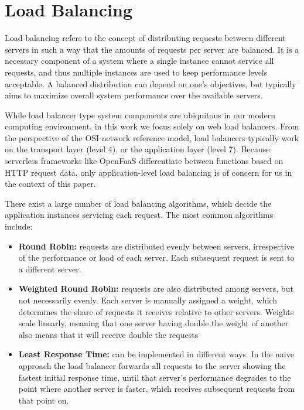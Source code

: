 \documentclass[draft,final]{vutinfth} %
\begin{document}
\section{Load Balancing}
Load balancing refers to the concept of distributing requests between different servers in such a way that the amounts of requests per server are balanced.
It is a necessary component of a system where a single instance cannot service all requests, and thus multiple instances are used to keep performance levels acceptable.
A balanced distribution can depend on one's objectives, but typically aims to maximize overall system performance over the available servers\cite{cardelliniDynamicLoadBalancing1999a}.

While load balancer type system components are ubiquitous in our modern computing environment, in this work we focus solely on web load balancers.
From the perspective of the OSI network reference model\cite{dayOSIReferenceModel1983}, load balancers typically work on the transport layer (level 4), or the application layer (level 7).
Because serverless frameworks like OpenFaaS differentiate between functions based on HTTP request data, only application-level load balancing is of concern for us in the context of this paper.

There exist a large number of load balancing algorithms, which decide the application instances servicing each request.
The most common algorithms include:
\begin{itemize}
    \item \textbf{Round Robin:} requests are distributed evenly between servers, irrespective of the performance or load of each server. Each subsequent request is sent to a different server.
    \item \textbf{Weighted Round Robin:} requests are also distributed among servers, but not necessarily evenly. Each server is manually assigned a weight, which determines the share of requests it receives relative to other servers. Weights scale linearly, meaning that one server having double the weight of another also means that it will receive double the requests
    \item \textbf{Least Response Time:} can be implemented in different ways. In the naive approach the load balancer forwards all requests to the server showing the fastest initial response time, until that server's performance degrades to the point where another server is faster, which receives subsequent requests from that point on.
\end{itemize}
\end{document}
